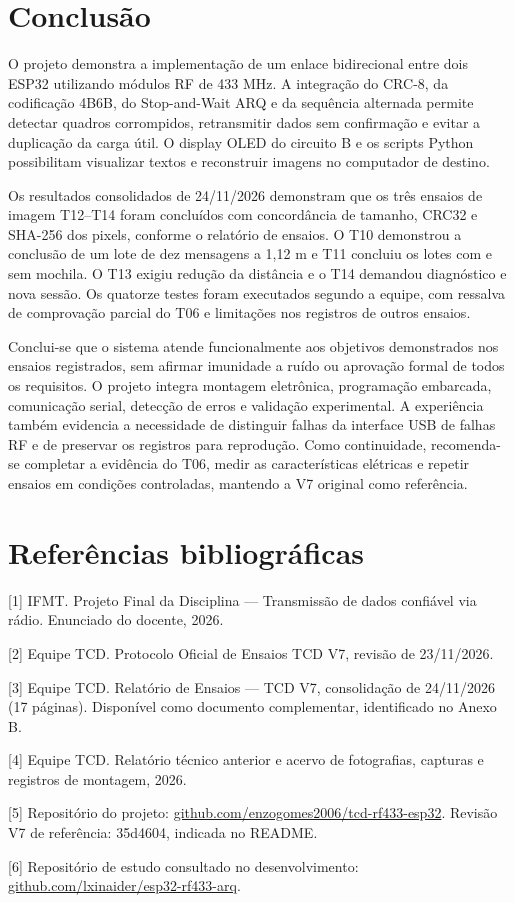 \clearpage\section{Conclusão}
O projeto demonstra a implementação de um enlace bidirecional entre dois ESP32 utilizando módulos RF de 433 MHz. A integração do CRC-8, da codificação 4B6B, do Stop-and-Wait ARQ e da sequência alternada permite detectar quadros corrompidos, retransmitir dados sem confirmação e evitar a duplicação da carga útil. O display OLED do circuito B e os scripts Python possibilitam visualizar textos e reconstruir imagens no computador de destino.

Os resultados consolidados de 24/11/2026 demonstram que os três ensaios de imagem T12–T14 foram concluídos com concordância de tamanho, CRC32 e SHA-256 dos pixels, conforme o relatório de ensaios. O T10 demonstrou a conclusão de um lote de dez mensagens a 1,12 m e T11 concluiu os lotes com e sem mochila. O T13 exigiu redução da distância e o T14 demandou diagnóstico e nova sessão. Os quatorze testes foram executados segundo a equipe, com ressalva de comprovação parcial do T06 e limitações nos registros de outros ensaios.

Conclui-se que o sistema atende funcionalmente aos objetivos demonstrados nos ensaios registrados, sem afirmar imunidade a ruído ou aprovação formal de todos os requisitos. O projeto integra montagem eletrônica, programação embarcada, comunicação serial, detecção de erros e validação experimental. A experiência também evidencia a necessidade de distinguir falhas da interface USB de falhas RF e de preservar os registros para reprodução. Como continuidade, recomenda-se completar a evidência do T06, medir as características elétricas e repetir ensaios em condições controladas, mantendo a V7 original como referência.

\section*{Referências bibliográficas}
{\small [1] IFMT. Projeto Final da Disciplina — Transmissão de dados confiável via rádio. Enunciado do docente, 2026.\par}
{\small [2] Equipe TCD. Protocolo Oficial de Ensaios TCD V7, revisão de 23/11/2026.\par}
{\small [3] Equipe TCD. Relatório de Ensaios — TCD V7, consolidação de 24/11/2026 (17 páginas). Disponível como documento complementar, identificado no Anexo B.\par}
{\small [4] Equipe TCD. Relatório técnico anterior e acervo de fotografias, capturas e registros de montagem, 2026.\par}
{\small [5] Repositório do projeto: \href{https://github.com/enzogomes2006/tcd-rf433-esp32}{github.com/enzogomes2006/tcd-rf433-esp32}. Revisão V7 de referência: 35d4604, indicada no README.\par}
{\small [6] Repositório de estudo consultado no desenvolvimento: \href{https://github.com/lxinaider/esp32-rf433-arq}{github.com/lxinaider/esp32-rf433-arq}.\par}

